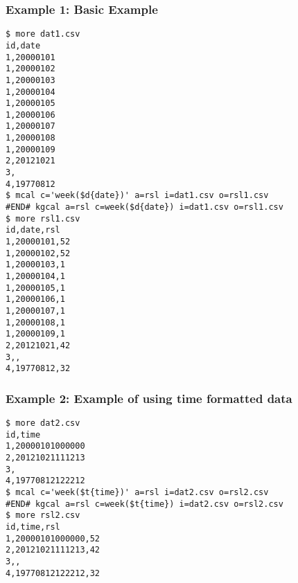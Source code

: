 \subsubsection*{Example 1: Basic Example}



\begin{Verbatim}[baselinestretch=0.7,frame=single]
$ more dat1.csv
id,date
1,20000101
1,20000102
1,20000103
1,20000104
1,20000105
1,20000106
1,20000107
1,20000108
1,20000109
2,20121021
3,
4,19770812
$ mcal c='week($d{date})' a=rsl i=dat1.csv o=rsl1.csv
#END# kgcal a=rsl c=week($d{date}) i=dat1.csv o=rsl1.csv
$ more rsl1.csv
id,date,rsl
1,20000101,52
1,20000102,52
1,20000103,1
1,20000104,1
1,20000105,1
1,20000106,1
1,20000107,1
1,20000108,1
1,20000109,1
2,20121021,42
3,,
4,19770812,32
\end{Verbatim}
\subsubsection*{Example 2: Example of using time formatted data}



\begin{Verbatim}[baselinestretch=0.7,frame=single]
$ more dat2.csv
id,time
1,20000101000000
2,20121021111213
3,
4,19770812122212
$ mcal c='week($t{time})' a=rsl i=dat2.csv o=rsl2.csv
#END# kgcal a=rsl c=week($t{time}) i=dat2.csv o=rsl2.csv
$ more rsl2.csv
id,time,rsl
1,20000101000000,52
2,20121021111213,42
3,,
4,19770812122212,32
\end{Verbatim}
